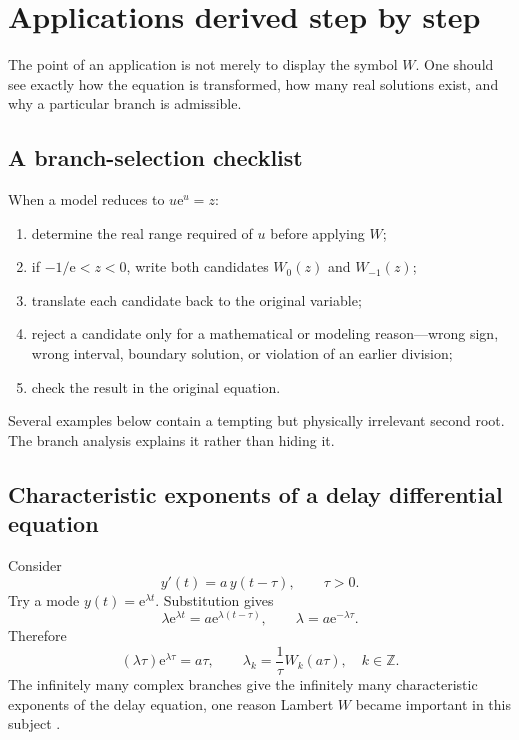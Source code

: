 \documentclass[11pt,oneside]{book}
\theoremstyle{definition}
\theoremstyle{remark}
\newcommand{\ee}{\mathrm e}
\newcommand{\Z}{\mathbb Z}
\begin{document}
\chapter{Applications derived step by step}\label{ch:applications}

The point of an application is not merely to display the symbol $W$.  One
should see exactly how the equation is transformed, how many real solutions
exist, and why a particular branch is admissible.

\section{A branch-selection checklist}

When a model reduces to $u\ee^u=z$:
\begin{enumerate}
\item determine the real range required of $u$ before applying $W$;
\item if $-1/\ee<z<0$, write both candidates $W_0(z)$ and $W_{-1}(z)$;
\item translate each candidate back to the original variable;
\item reject a candidate only for a mathematical or modeling reason---wrong
sign, wrong interval, boundary solution, or violation of an earlier division;
\item check the result in the original equation.
\end{enumerate}
Several examples below contain a tempting but physically irrelevant second
root.  The branch analysis explains it rather than hiding it.

\section{Characteristic exponents of a delay differential equation}

Consider
\begin{equation}\label{eq:delayde}
 y'(t)=a\,y(t-\tau),
 \qquad \tau>0.
\end{equation}
Try a mode $y(t)=\ee^{\lambda t}$.  Substitution gives
\[
 \lambda\ee^{\lambda t}
 =a\ee^{\lambda(t-\tau)},
 \qquad
 \lambda=a\ee^{-\lambda\tau}.
\]
Therefore
\begin{equation}\label{eq:delayroots}
 (\lambda\tau)\ee^{\lambda\tau}=a\tau,
 \qquad
 \boxed{\lambda_k=\frac1\tau W_k(a\tau)},
 \quad k\in\Z.
\end{equation}
The infinitely many complex branches give the infinitely many characteristic
exponents of the delay equation, one reason Lambert $W$ became important in
this subject \cite{corless1996}.
\end{document}
